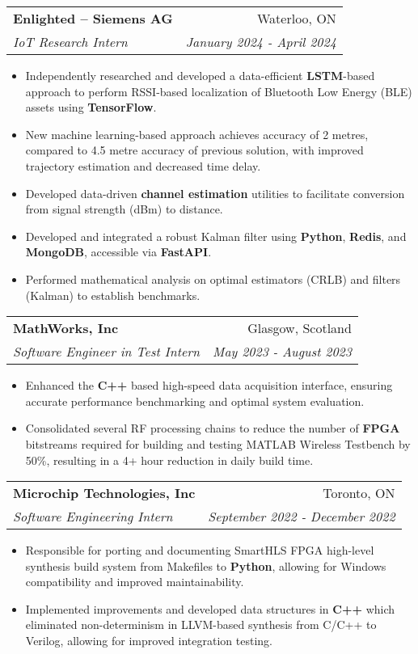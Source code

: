 \documentclass[letterpaper,11pt]{article}
\makeatletter
\newcommand{\resumeItem}[1]{
  \item\small{
    {#1 \vspace{-2pt}}
  }
}
\newcommand{\resumeSubheading}[4]{
  \vspace{-1pt}\item[]
  \begin{tabular*}{0.98\textwidth}{l@{\extracolsep{\fill}}r}
      \hspace{-10pt}\textbf{#1} & #2 \\
      \hspace{-10pt}\textit{\small#3} & \textit{\small #4} \\
    \end{tabular*}\vspace{-5pt}
}
\newcommand{\resumeItemListStart}{\begin{itemize}}
\newcommand{\resumeItemListEnd}{\end{itemize}\vspace{-5pt}}
\makeatother
\begin{document}
    \resumeSubheading
      {Enlighted -- Siemens AG}{Waterloo, ON}
      {IoT Research Intern}{January 2024 - April 2024}
    \resumeItemListStart
    \resumeItem{Independently researched and developed a data-efficient \textbf{LSTM}-based approach to perform RSSI-based localization of Bluetooth Low Energy (BLE) assets using \textbf{TensorFlow}.}
      \resumeItem{New machine learning-based approach achieves accuracy of 2 metres, compared to 4.5 metre accuracy of previous solution, with improved trajectory estimation and decreased time delay.}
      \resumeItem{Developed data-driven \textbf{channel estimation} utilities to facilitate conversion from signal strength (dBm) to distance.}
      \resumeItem{Developed and integrated a robust Kalman filter using \textbf{Python}, \textbf{Redis}, and \textbf{MongoDB}, accessible via \textbf{FastAPI}.}
      \resumeItem{Performed mathematical analysis on optimal estimators (CRLB) and filters (Kalman) to establish benchmarks.}
    \resumeItemListEnd
    \vspace{-10pt}

    \resumeSubheading
      {MathWorks, Inc}{Glasgow, Scotland}
      {Software Engineer in Test Intern}{May 2023 - August 2023}
      \resumeItemListStart
        \resumeItem{Enhanced the \textbf{C++} based high-speed data acquisition interface, ensuring accurate performance benchmarking and optimal system evaluation.}
        \resumeItem{Consolidated several RF processing chains to reduce the number of \textbf{FPGA} bitstreams required for building and testing MATLAB Wireless Testbench by 50\%, resulting in a 4+ hour reduction in daily build time.}

      \resumeItemListEnd
      \vspace{-5pt}
    \resumeSubheading
      {Microchip Technologies, Inc}{Toronto, ON}
      {Software Engineering Intern}{September 2022 - December 2022}
      \resumeItemListStart
        \resumeItem{Responsible for porting and documenting SmartHLS FPGA high-level synthesis build system from Makefiles to \textbf{Python}, allowing for Windows compatibility and improved maintainability.}
        \resumeItem{Implemented improvements and developed data structures in \textbf{C++} which eliminated non-determinism in LLVM-based synthesis from C/C++ to Verilog, allowing for improved integration testing.}
      \resumeItemListEnd
      \vspace{-5pt}
\end{document}
